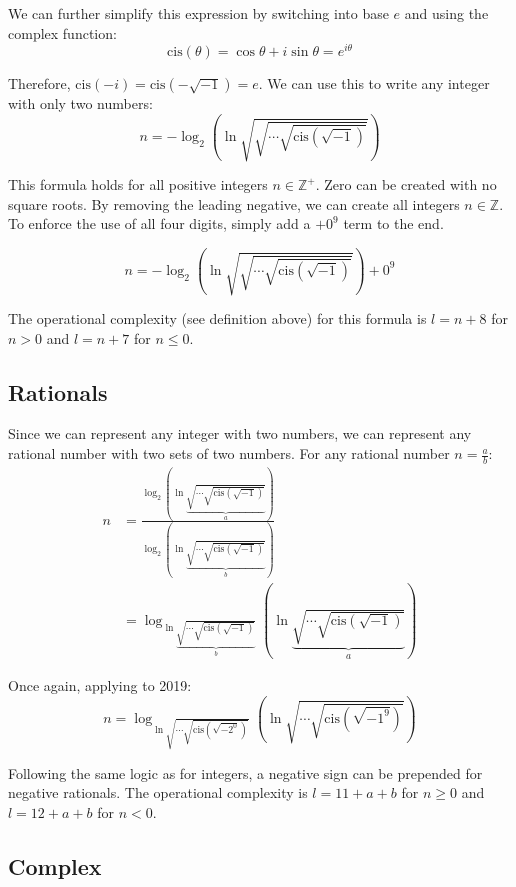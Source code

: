 We can further simplify this expression by switching into base $e$ and using the complex function:
\begin{equation}
  \mathrm{cis}(\theta) = \cos\theta + i\sin\theta = e^{i\theta}
\end{equation}

Therefore, $\mathrm{cis}(-i)=\mathrm{cis}(-\sqrt{-1})=e$. We can use this to write any integer with only two numbers:
\begin{equation}
  n = -\log_2\left( \ln \sqrt{\sqrt{\cdots\sqrt{\mathrm{cis}(\sqrt{-1})}}}\right)
\end{equation}

This formula holds for all positive integers $n\in\mathbb{Z}^+$.
Zero can be created with no square roots.
By removing the leading negative, we can create all integers $n\in\mathbb{Z}$.
To enforce the use of all four digits, simply add a $+0^9$ term to the end.

\begin{equation}
  n = -\log_2\left( \ln \sqrt{\sqrt{\cdots\sqrt{\mathrm{cis}(\sqrt{-1})}}}\right)+0^9
\end{equation}

The operational complexity (see definition above) for this formula is $l=n+8$ for $n>0$ and $l=n+7$ for $n\leq0$.

\subsection{Rationals}
Since we can represent any integer with two numbers, we can represent any rational number with two sets of two numbers.
For any rational number $n=\frac{a}{b}$:
\begin{align*}
  n &= \frac{
    \log_2\left(
      \ln \underbrace{\sqrt{\cdots\sqrt{\mathrm{cis}(\sqrt{-1})}}}_{a} 
    \right)
  }{
    \log_2\left(
      \ln \underbrace{\sqrt{\cdots\sqrt{\mathrm{cis}(\sqrt{-1})}}}_{b} 
    \right)
  } \\
  &= \log_{
    \ln \underbrace{\sqrt{\cdots\sqrt{\mathrm{cis}(\sqrt{-1})}}}_{b}
  }
  \left(
    \ln \underbrace{\sqrt{\cdots\sqrt{\mathrm{cis}(\sqrt{-1})}}}_{a}
  \right)
\end{align*}

Once again, applying to 2019:
\begin{equation}
  n = \log_{
    \ln\sqrt{\cdots\sqrt{\mathrm{cis}(\sqrt{-2^0})}}
  }
  \left(
    \ln\sqrt{\cdots\sqrt{\mathrm{cis}(\sqrt{-1^9})}}
  \right)
\end{equation}

Following the same logic as for integers, a negative sign can be prepended for negative rationals. The operational complexity is $l=11+a+b$ for $n\geq0$ and $l=12+a+b$ for $n<0$.

\subsection{Complex}
